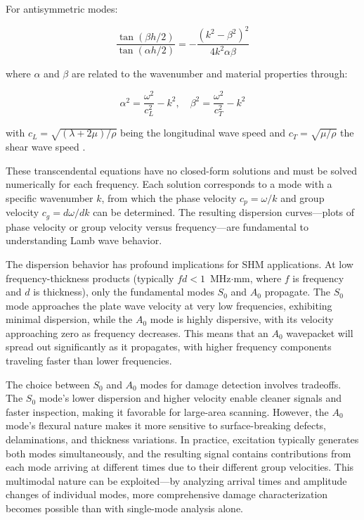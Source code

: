 \documentclass[12pt,a4paper]{report}
\begin{document}
For antisymmetric modes:

\begin{equation}
\frac{\tan(\beta h/2)}{\tan(\alpha h/2)} = -\frac{(k^2 - \beta^2)^2}{4k^2 \alpha \beta}
\end{equation}

where $\alpha$ and $\beta$ are related to the wavenumber and material properties through:

\begin{equation}
\alpha^2 = \frac{\omega^2}{c_L^2} - k^2, \quad \beta^2 = \frac{\omega^2}{c_T^2} - k^2
\end{equation}

with $c_L = \sqrt{(\lambda + 2\mu)/\rho}$ being the longitudinal wave speed and $c_T = \sqrt{\mu/\rho}$ the shear wave speed \citep{SU2016353}.

These transcendental equations have no closed-form solutions and must be solved numerically for each frequency. Each solution corresponds to a mode with a specific wavenumber $k$, from which the phase velocity $c_p = \omega/k$ and group velocity $c_g = d\omega/dk$ can be determined. The resulting dispersion curves—plots of phase velocity or group velocity versus frequency—are fundamental to understanding Lamb wave behavior.


The dispersion behavior has profound implications for SHM applications. At low frequency-thickness products (typically $fd < 1$~MHz$\cdot$mm, where $f$ is frequency and $d$ is thickness), only the fundamental modes $S_0$ and $A_0$ propagate. The $S_0$ mode approaches the plate wave velocity at very low frequencies, exhibiting minimal dispersion, while the $A_0$ mode is highly dispersive, with its velocity approaching zero as frequency decreases. This means that an $A_0$ wavepacket will spread out significantly as it propagates, with higher frequency components traveling faster than lower frequencies.

The choice between $S_0$ and $A_0$ modes for damage detection involves tradeoffs. The $S_0$ mode's lower dispersion and higher velocity enable cleaner signals and faster inspection, making it favorable for large-area scanning. However, the $A_0$ mode's flexural nature makes it more sensitive to surface-breaking defects, delaminations, and thickness variations. In practice, excitation typically generates both modes simultaneously, and the resulting signal contains contributions from each mode arriving at different times due to their different group velocities. This multimodal nature can be exploited—by analyzing arrival times and amplitude changes of individual modes, more comprehensive damage characterization becomes possible than with single-mode analysis alone.
\end{document}
